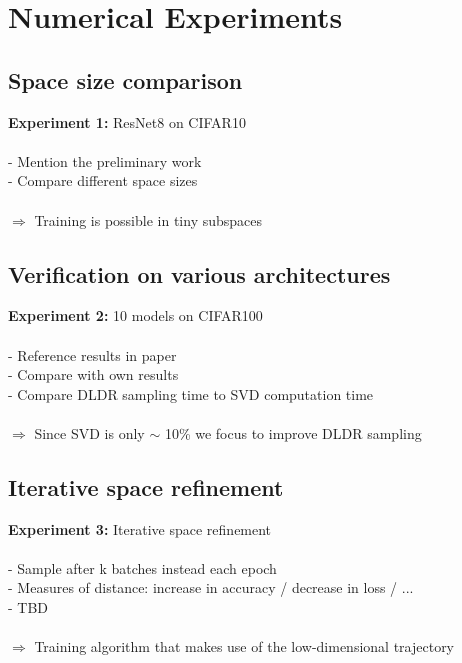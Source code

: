 \documentclass[11pt, a4paper]{article}
\begin{document}
\pagebreak
\section{Numerical Experiments} \label{sec:Experiments}

\subsection{Space size comparison}

\textbf{Experiment 1:} ResNet8 on CIFAR10 \\
\ \\
- Mention the preliminary work \\
- Compare different space sizes \\
\ \\
$\Rightarrow$ Training is possible in tiny subspaces \\

\subsection{Verification on various architectures}

\textbf{Experiment 2:} 10 models on CIFAR100 \\
\ \\
- Reference results in paper \\
- Compare with own results \\
- Compare DLDR sampling time to SVD computation time \\
\ \\
$\Rightarrow$ Since SVD is only $\sim$ 10\% we focus to improve DLDR sampling \\

\subsection{Iterative space refinement}

\textbf{Experiment 3:} Iterative space refinement \\
\ \\
- Sample after k batches instead each epoch \\
- Measures of distance: increase in accuracy / decrease in loss / ... \\
- TBD \\
\ \\
$\Rightarrow$ Training algorithm that makes use of the low-dimensional trajectory \\
\end{document}
